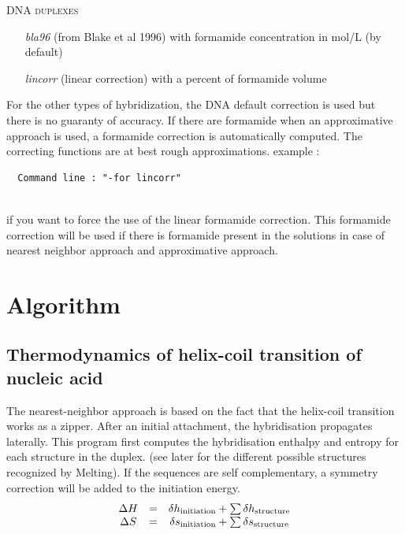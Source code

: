 \documentclass{article}
\begin{document}
\begin{description}
  \textsc{DNA duplexes}
    \begin{itemize}
    \item [\textit{bla96}] (from Blake et al 1996) with formamide concentration in mol/L  (by default)
    \item [\textit{lincorr}] (linear correction) with a percent of formamide volume		  	 
    \end{itemize}
  For the other types of hybridization, the DNA default correction is used but there is no guaranty of accuracy.
  If there are formamide when an approximative approach is used, a formamide correction is automatically computed.
  The correcting functions are  at  best rough  approximations.
  example :
  
  \begin{verbatim}
  Command line : "-for lincorr" 
  
  \end{verbatim}
  if you want to force the use of the linear formamide correction. This formamide correction will be used if there is formamide 
  present in the solutions in case of nearest neighbor approach and approximative approach. 
\end{description}

 
\section{Algorithm }
  

\subsection{Thermodynamics of helix-coil transition of nucleic acid}  
The nearest-neighbor approach is based on the fact that the helix-coil
transition works as a zipper. After an initial attachment, the hybridisation
propagates laterally. This program first computes the hybridisation enthalpy 
and entropy for each structure in the duplex. (see later for the different possible
structures recognized by Melting). If the sequences are self complementary, a 
symmetry correction will be added to the initiation energy.
\begin{displaymath}
  \begin{array}[t]{ccc}
  \Delta{}H&=&\delta{}h_\mathrm{initiation}+\sum \delta{}h_\mathrm{structure}\\
  \Delta{}S&=&\delta{}s_\mathrm{initiation}+\sum \delta{}s_\mathrm{structure}
  \end{array}
\end{displaymath} 
\end{document}

